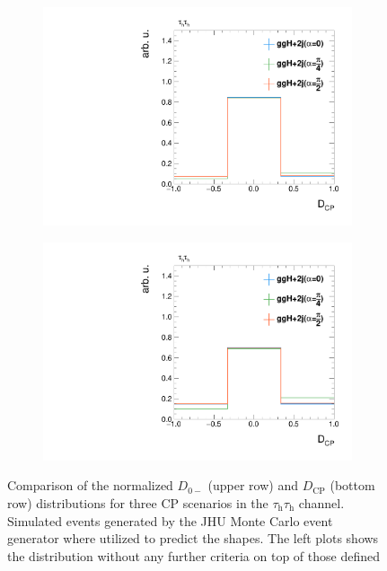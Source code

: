 \begin{figure}[h!]
\begin{subfigure}{.49\textwidth}
       \includegraphics[width=\textwidth]{Figures/eventselection/CPHypotheses/JHU_DCP_no_cuts.pdf}%
   \end{subfigure}
   \begin{subfigure}{.49\textwidth}
       \centering
       \includegraphics[width=\textwidth]{Figures/eventselection/CPHypotheses/JHU_DCP_mjj_cuts.pdf} \\%
   \end{subfigure}    
   \caption[$D_{0-}$ and $D_\text{CP}$ shape comparison.]{Comparison of the normalized $D_{0-}$ (upper row) and $D_\text{CP}$ (bottom row) distributions for three CP scenarios in the $\tau_\text{h}\tau_\text{h}$ channel. Simulated events generated by the JHU Monte Carlo event generator where utilized to predict the shapes. The left plots shows the distribution without any further criteria on top of those defined 
}
\end{figure}
